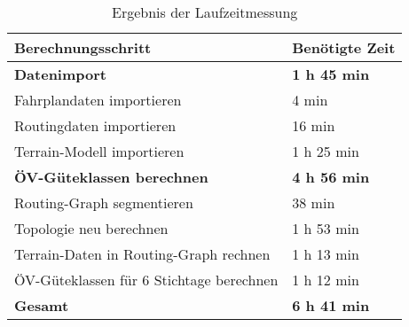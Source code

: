 \begin{table}[H]
    \centering
    \begin{tabular}[H]{l l}
        \toprule
        \textbf{Berechnungsschritt}
                                & \textbf{Benötigte Zeit}\\
        \midrule
        \textbf{Datenimport}
                                & \textbf{1 h 45 min} \\
        \hspace{3mm} Fahrplandaten importieren
                                & \hspace{3mm} 4 min \\
        \hspace{3mm} Routingdaten importieren
                                & \hspace{3mm} 16 min \\
        \hspace{3mm} Terrain-Modell importieren
                                & \hspace{3mm} 1 h 25 min \\
        \midrule
        \textbf{\gls{ÖV-Güteklassen} berechnen}
                                & \textbf{4 h 56 min} \\
        \hspace{3mm} \gls{Routing-Graph} segmentieren
                                & \hspace{3mm} 38 min \\
        \hspace{3mm} Topologie neu berechnen
                                & \hspace{3mm} 1 h 53 min \\
        \hspace{3mm} Terrain-Daten in \gls{Routing-Graph} rechnen
                                & \hspace{3mm} 1 h 13 min \\
        \hspace{3mm} \gls{ÖV-Güteklassen} für 6 Stichtage berechnen
                                & \hspace{3mm} 1 h 12 min \\
        \midrule
        \textbf{Gesamt}
                                & \textbf{6 h 41 min} \\
        \bottomrule
    \end{tabular}
    \caption{Ergebnis der Laufzeitmessung}
    \label{table:Ergebnis_Laufzeitmessung}
\end{table}


